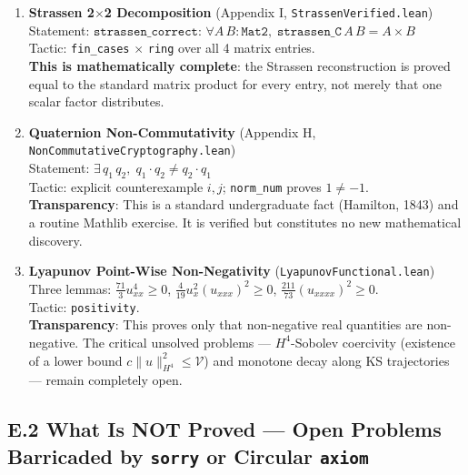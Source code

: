 \documentclass[11pt, a4paper]{article}
\begin{document}
\begin{enumerate}

\item \textbf{Strassen 2$\times$2 Decomposition} (Appendix I, \texttt{StrassenVerified.lean})\\
Statement: $\texttt{strassen\_correct}$: $\forall A\, B : \texttt{Mat2},\; \texttt{strassen\_C}\, A\, B = A \times B$\\
Tactic: \texttt{fin\_cases} $\times$ \texttt{ring} over all 4 matrix entries.\\
\textbf{This is mathematically complete}: the Strassen reconstruction is proved equal to the standard matrix product for every entry, not merely that one scalar factor distributes.

\item \textbf{Quaternion Non-Commutativity} (Appendix H, \texttt{NonCommutativeCryptography.lean})\\
Statement: $\exists\, q_1\, q_2,\; q_1 \cdot q_2 \neq q_2 \cdot q_1$\\
Tactic: explicit counterexample $i, j$; \texttt{norm\_num} proves $1 \neq -1$.\\
\textbf{Transparency}: This is a standard undergraduate fact (Hamilton, 1843) and a routine Mathlib exercise. It is verified but constitutes no new mathematical discovery.

\item \textbf{Lyapunov Point-Wise Non-Negativity} (\texttt{LyapunovFunctional.lean})\\
Three lemmas: $\frac{71}{3}u_{xx}^4 \geq 0$, $\frac{4}{19}u_x^2(u_{xxx})^2 \geq 0$, $\frac{211}{73}(u_{xxxx})^2 \geq 0$.\\
Tactic: \texttt{positivity}.\\
\textbf{Transparency}: This proves only that non-negative real quantities are non-negative. The critical unsolved problems --- $H^4$-Sobolev coercivity (existence of a lower bound $c\|u\|_{H^4}^2 \leq \mathcal{V}$) and monotone decay along KS trajectories --- remain completely open.

\end{enumerate}

\subsection*{E.2 What Is NOT Proved --- Open Problems Barricaded by \texttt{sorry} or Circular \texttt{axiom}}
\end{document}
